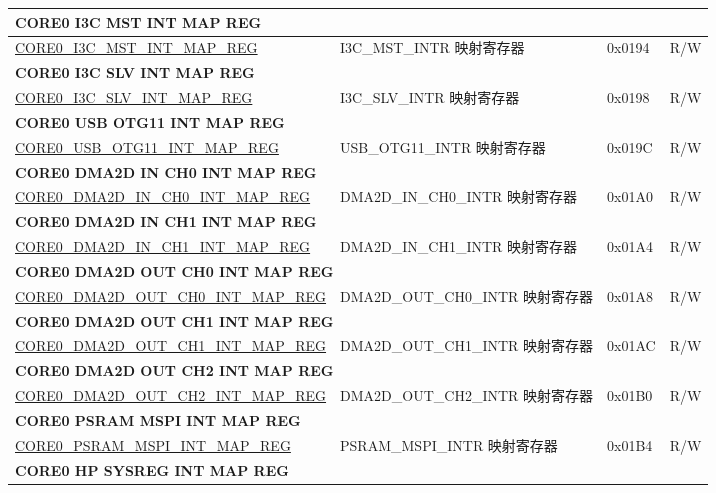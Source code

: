 \begin{longtable}{ | p{8.7cm} | p{6.2cm} | p{1.3cm} | p{1cm} | }
\multicolumn{4}{|l|}{\textbf{CORE0 I3C MST INT MAP REG}} \\ \hline
\hyperref[regdesc:CORE0I3CMSTINTMAPREG]{CORE0\_I3C\_MST\_INT\_MAP\_REG} & I3C\_MST\_INTR 映射寄存器 & 0x0194 & R/W \\ \hline
\multicolumn{4}{|l|}{\textbf{CORE0 I3C SLV INT MAP REG}} \\ \hline
\hyperref[regdesc:CORE0I3CSLVINTMAPREG]{CORE0\_I3C\_SLV\_INT\_MAP\_REG} & I3C\_SLV\_INTR 映射寄存器 & 0x0198 & R/W \\ \hline
\multicolumn{4}{|l|}{\textbf{CORE0 USB OTG11 INT MAP REG}} \\ \hline
\hyperref[regdesc:CORE0USBOTG11INTMAPREG]{CORE0\_USB\_OTG11\_INT\_MAP\_REG} & USB\_OTG11\_INTR 映射寄存器 & 0x019C & R/W \\ \hline
\multicolumn{4}{|l|}{\textbf{CORE0 DMA2D IN CH0 INT MAP REG}} \\ \hline
\hyperref[regdesc:CORE0DMA2DINCH0INTMAPREG]{CORE0\_DMA2D\_IN\_CH0\_INT\_MAP\_REG} & DMA2D\_IN\_CH0\_INTR 映射寄存器 & 0x01A0 & R/W \\ \hline
\multicolumn{4}{|l|}{\textbf{CORE0 DMA2D IN CH1 INT MAP REG}} \\ \hline
\hyperref[regdesc:CORE0DMA2DINCH1INTMAPREG]{CORE0\_DMA2D\_IN\_CH1\_INT\_MAP\_REG} & DMA2D\_IN\_CH1\_INTR 映射寄存器 & 0x01A4 & R/W \\ \hline
\multicolumn{4}{|l|}{\textbf{CORE0 DMA2D OUT CH0 INT MAP REG}} \\ \hline
\hyperref[regdesc:CORE0DMA2DOUTCH0INTMAPREG]{CORE0\_DMA2D\_OUT\_CH0\_INT\_MAP\_REG} & DMA2D\_OUT\_CH0\_INTR 映射寄存器 & 0x01A8 & R/W \\ \hline
\multicolumn{4}{|l|}{\textbf{CORE0 DMA2D OUT CH1 INT MAP REG}} \\ \hline
\hyperref[regdesc:CORE0DMA2DOUTCH1INTMAPREG]{CORE0\_DMA2D\_OUT\_CH1\_INT\_MAP\_REG} & DMA2D\_OUT\_CH1\_INTR 映射寄存器 & 0x01AC & R/W \\ \hline
\multicolumn{4}{|l|}{\textbf{CORE0 DMA2D OUT CH2 INT MAP REG}} \\ \hline
\hyperref[regdesc:CORE0DMA2DOUTCH2INTMAPREG]{CORE0\_DMA2D\_OUT\_CH2\_INT\_MAP\_REG} & DMA2D\_OUT\_CH2\_INTR 映射寄存器 & 0x01B0 & R/W \\ \hline
\multicolumn{4}{|l|}{\textbf{CORE0 PSRAM MSPI INT MAP REG}} \\ \hline
\hyperref[regdesc:CORE0PSRAMMSPIINTMAPREG]{CORE0\_PSRAM\_MSPI\_INT\_MAP\_REG} & PSRAM\_MSPI\_INTR 映射寄存器 & 0x01B4 & R/W \\ \hline
\multicolumn{4}{|l|}{\textbf{CORE0 HP SYSREG INT MAP REG}} \\ \hline

\end{longtable}
